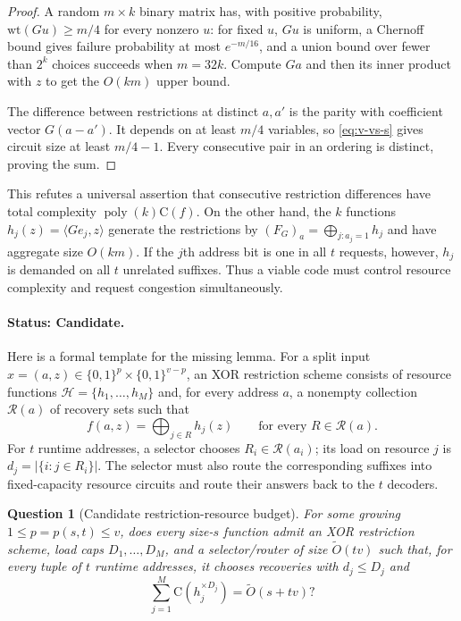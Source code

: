 \documentclass[11pt]{article}
\newtheorem{question}[theorem]{Question}
\theoremstyle{definition}
\newcommand{\bits}{\{0,1\}}
\newcommand{\C}{\mathrm{C}}
\newcommand{\poly}{\operatorname{poly}}
\newcommand{\candidate}{\textcolor{BurntOrange}{\textbf{Candidate}}}
\begin{document}
\begin{proof}
A random $m\times k$ binary matrix has, with positive probability,
$\mathrm{wt}(Gu)\ge m/4$ for every nonzero $u$: for fixed $u$, $Gu$ is
uniform, a Chernoff bound gives failure probability at most $e^{-m/16}$, and
a union bound over fewer than $2^k$ choices succeeds when $m=32k$.  Compute
$Ga$ and then its inner product with $z$ to get the $O(km)$ upper bound.

The difference between restrictions at distinct $a,a'$ is the parity with
coefficient vector $G(a-a')$.  It depends on at least $m/4$ variables, so
\eqref{eq:v-vs-s} gives circuit size at least $m/4-1$.  Every consecutive pair
in an ordering is distinct, proving the sum.
\end{proof}

This refutes a universal assertion that consecutive restriction differences
have total complexity $\poly(k)\C(f)$.  On the other hand, the $k$ functions
$h_j(z)=\langle Ge_j,z\rangle$ generate the restrictions by
$(F_G)_a=\bigoplus_{j:a_j=1}h_j$ and have aggregate size $O(km)$.  If the
$j$th address bit is one in all $t$ requests, however, $h_j$ is demanded on
all $t$ unrelated suffixes.  Thus a viable code must control resource
complexity and request congestion simultaneously.

\paragraph{Status: \candidate.}
Here is a formal template for the missing lemma.  For a split input
$x=(a,z)\in\bits^p\times\bits^{v-p}$, an XOR restriction scheme consists of
resource functions $\mathcal H=\{h_1,\ldots,h_M\}$ and, for every address
$a$, a nonempty collection $\mathcal R(a)$ of recovery sets such that
\[
 f(a,z)=\bigoplus_{j\in R}h_j(z)
 \qquad\text{for every }R\in\mathcal R(a).
\]
For $t$ runtime addresses, a selector chooses $R_i\in\mathcal R(a_i)$; its
load on resource $j$ is $d_j=|\{i:j\in R_i\}|$.  The selector must also route
the corresponding suffixes into fixed-capacity resource circuits and route
their answers back to the $t$ decoders.

\begin{question}[Candidate restriction-resource budget]
\label{q:restriction-budget}
For some growing $1\le p=p(s,t)\le v$, does every size-$s$ function admit an
XOR restriction scheme, load caps $D_1,\ldots,D_M$, and a selector/router of
size $\widetilde O(tv)$ such that, for every tuple of $t$ runtime addresses,
it chooses recoveries with $d_j\le D_j$ and
\[
  \sum_{j=1}^M\C(h_j^{\times D_j})
    =\widetilde O(s+tv)?
\]
\end{question}
\end{document}
